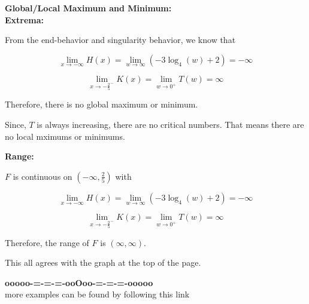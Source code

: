 \documentclass{ximera}
\begin{document}
\textbf{\textcolor{blue!55!black}{Global/Local Maximum and Minimum:}} \\
\textbf{Extrema:} 

From the end-behavior and singularity behavior, we know that 




\[
\lim\limits_{x \to -\infty} H(x)  = \lim\limits_{w \to \infty} (-3 \log_4(w) + 2)  = -\infty
\]



\[
\lim\limits_{x \to -\frac{2}{5}^-} K(x)  = \lim\limits_{w \to 0^+} T(w) = \infty
\]


Therefore, there is no global maximum or minimum. 


Since, $T$ is always increasing, there are no critical numbers.  That means there are no local mximums or minimums. 












\textbf{\textcolor{blue!55!black}{Range:}} 


$F$ is continuous on $\left( -\infty, \frac{2}{5} \right)$ with 




\[
\lim\limits_{x \to -\infty} H(x)  = \lim\limits_{w \to \infty} (-3 \log_4(w) + 2)  = -\infty
\]



\[
\lim\limits_{x \to -\frac{2}{5}^-} K(x)  = \lim\limits_{w \to 0^+} T(w) = \infty
\]


Therefore, the range of $F$ is $(\infty, \infty)$.





This all agrees with the graph at the top of the page. 






















\begin{center}
\textbf{\textcolor{green!50!black}{ooooo-=-=-=-ooOoo-=-=-=-ooooo}} \\

more examples can be found by following this link\\ 

\end{center}
\end{document}
